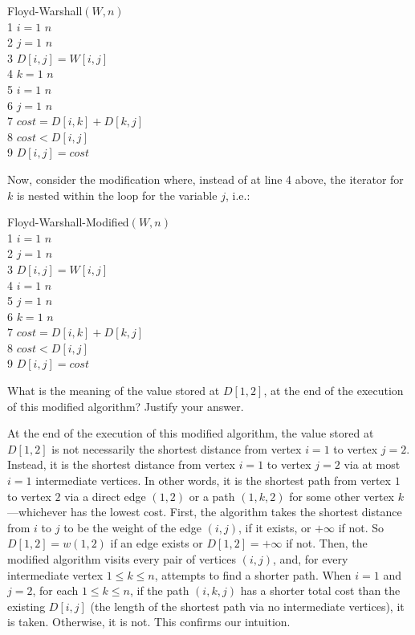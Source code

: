 \begin{code}
	{\sc Floyd-Warshall}$(W,n)$\\
	1 \> \For $i=1$ \To $n$\\
	2 \> \> \For $j=1$ \To $n$\\
	3 \> \> \> $D[i,j]=W[i,j]$\\
	4 \> \For $k=1$ \To $n$\\
	5 \> \> \For $i=1$ \To $n$\\
	6 \> \> \> \For $j=1$ \To $n$\\
	7 \> \> \> \> $cost=D[i,k]+D[k,j]$\\
	8 \> \> \> \> \If $cost<D[i,j]$ \\
	9 \> \> \> \> \> $D[i,j]=cost$\\
\end{code}
Now, consider the modification where, instead of at line 4 above, the iterator for $k$ is nested within the loop for the variable $j$, i.e.:
\begin{code}
	{\sc Floyd-Warshall-Modified}$(W,n)$\\
	1 \> \For $i=1$ \To $n$\\
	2 \> \> \For $j=1$ \To $n$\\
	3 \> \> \> $D[i,j]=W[i,j]$\\
	4 \> \For $i=1$ \To $n$\\
	5 \> \> \For $j=1$ \To $n$\\
	6 \> \> \> \For $k=1$ \To $n$\\
	7 \> \> \> \> $cost=D[i,k]+D[k,j]$\\
	8 \> \> \> \> \If $cost<D[i,j]$ \\
	9 \> \> \> \> \> $D[i,j]=cost$\\
\end{code}
What is the meaning of the value stored at $D[1,2]$, at the end of the execution of this modified algorithm? Justify your answer. 
\begin{solution}
At the end of the execution of this modified algorithm, the value stored at $D[1,2]$ is not necessarily the shortest distance from vertex $i=1$ to vertex $j=2$. Instead, it is the shortest distance from vertex $i=1$ to vertex $j=2$ via at most $i=1$ intermediate vertices. In other words, it is the shortest path from vertex $1$ to vertex $2$ via a direct edge $(1,2)$ or a path $(1,k,2)$ for some other vertex $k$---whichever has the lowest cost. First, the algorithm takes the shortest distance from $i$ to $j$ to be the weight of the edge $(i,j)$, if it exists, or $+\infty$ if not. So $D[1,2]=w(1,2)$ if an edge exists or $D[1,2]=+\infty$ if not. Then, the modified algorithm visits every pair of vertices $(i,j)$, and, for every intermediate vertex $1\leq k\leq n$, attempts to find a shorter path. When $i=1$ and $j=2$, for each $1\leq k\leq n$, if the path $(i,k,j)$ has a shorter total cost than the existing $D[i,j]$ (the length of the shortest path via no intermediate vertices), it is taken. Otherwise, it is not. This confirms our intuition.
\end{solution}
